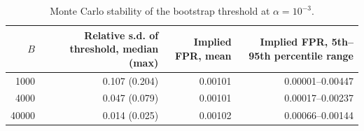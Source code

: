 \begin{table}[t]
\centering
\caption{Monte Carlo stability of the bootstrap threshold at $\alpha = 10^{-3}$.}
\label{tab:rq1-bootstrap}
\small
\begin{tabular}{rrrr}
\toprule
$B$ & Relative s.d. of threshold, median (max) & Implied FPR, mean & Implied FPR, 5th--95th percentile range \\
\midrule
1000 & 0.107 (0.204) & 0.00101 & 0.00001--0.00447 \\
4000 & 0.047 (0.079) & 0.00101 & 0.00017--0.00237 \\
40000 & 0.014 (0.025) & 0.00102 & 0.00066--0.00144 \\
\bottomrule
\end{tabular}
\end{table}
